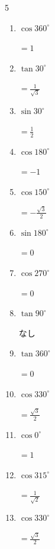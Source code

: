 \begin{multicols}{5}
\begin{enumerate}
  \item $\displaystyle \cos{360^\circ}$

        $\displaystyle =1$

  \item $\displaystyle \tan{30^\circ}$

        $\displaystyle =\frac{1}{\sqrt{3}}$

  \item $\displaystyle \sin{30^\circ}$

        $\displaystyle =\frac{1}{2}$

  \item $\displaystyle \cos{180^\circ}$

        $\displaystyle =-1$

  \item $\displaystyle \cos{150^\circ}$

        $\displaystyle =-\frac{\sqrt{3}}{2}$

  \item $\displaystyle \sin{180^\circ}$

        $\displaystyle =0$

  \item $\displaystyle \cos{270^\circ}$

        $\displaystyle =0$

\columnbreak %

\resetques

  \item $\displaystyle \tan{90^\circ}$

        $\displaystyle なし$

  \item $\displaystyle \tan{360^\circ}$

        $\displaystyle =0$

  \item $\displaystyle \cos{330^\circ}$

        $\displaystyle =\frac{\sqrt{3}}{2}$

  \item $\displaystyle \cos{0^\circ}$

        $\displaystyle =1$

  \item $\displaystyle \cos{315^\circ}$

        $\displaystyle =\frac{1}{\sqrt{2}}$

  \item $\displaystyle \cos{330^\circ}$

        $\displaystyle =\frac{\sqrt{3}}{2}$


\end{enumerate}
\end{multicols}
